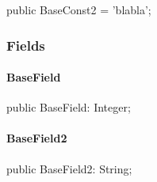 \documentclass{report}
\begin{document}
\begin{list}{}{
\setlength{\itemindent}{0cm}
\setlength{\listparindent}{0cm}
\setlength{\leftmargin}{\evensidemargin}
\addtolength{\leftmargin}{\tmplength}
\settowidth{\labelsep}{X}
\addtolength{\leftmargin}{\labelsep}
\setlength{\labelwidth}{\tmplength}
}
\begin{flushleft}
\item[\textbf{Declaration}\hfill]
\begin{ttfamily}
public BaseConst2 = 'blabla';\end{ttfamily}


\end{flushleft}
\end{list}
\subsubsection*{\large{\textbf{Fields}}\normalsize\hspace{1ex}\hfill}
\paragraph*{BaseField}\hspace*{\fill}

\begin{list}{}{
\setlength{\itemindent}{0cm}
\setlength{\listparindent}{0cm}
\setlength{\leftmargin}{\evensidemargin}
\addtolength{\leftmargin}{\tmplength}
\settowidth{\labelsep}{X}
\addtolength{\leftmargin}{\labelsep}
\setlength{\labelwidth}{\tmplength}
}
\begin{flushleft}
\item[\textbf{Declaration}\hfill]
\begin{ttfamily}
public BaseField: Integer;\end{ttfamily}


\end{flushleft}
\end{list}
\paragraph*{BaseField2}\hspace*{\fill}

\begin{list}{}{
\setlength{\itemindent}{0cm}
\setlength{\listparindent}{0cm}
\setlength{\leftmargin}{\evensidemargin}
\addtolength{\leftmargin}{\tmplength}
\settowidth{\labelsep}{X}
\addtolength{\leftmargin}{\labelsep}
\setlength{\labelwidth}{\tmplength}
}
\begin{flushleft}
\item[\textbf{Declaration}\hfill]
\begin{ttfamily}
public BaseField2: String;\end{ttfamily}


\end{flushleft}
\end{list}
\end{document}
